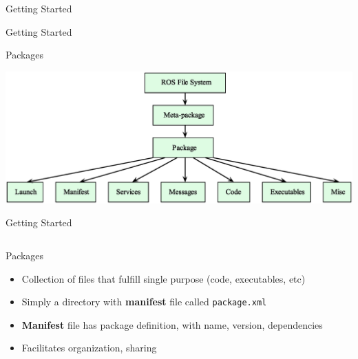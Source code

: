 \documentclass[9pt]{beamer}
\begin{document}
\begin{section}{Getting Started}
    \begin{frame}{Getting Started} \label{frame:packages}
        \begin{block}{Packages}
            \begin{center}
                \includegraphics[width=\textwidth,trim={0cm 0cm 0cm 0cm},clip]{img/ros_packages.eps}
            \end{center}        
        \end{block}
    \end{frame}
    \begin{frame}{Getting Started}
        \begin{columns}
            \begin{column}{0.5\textwidth}
                \begin{block}{Packages}
                    \begin{itemize}
                        \item Collection of files that fulfill single purpose (code, executables, etc)
                        \item Simply a directory with \textbf{manifest} file called \texttt{package.xml}
                        \item \textbf{Manifest} file has package definition, with name, version, dependencies
                        \item Facilitates organization, sharing
                    \end{itemize}
                \end{block}
            \end{column}
            \begin{column}{0.5\textwidth}
                \begin{center}

\end{center}
\end{column}
\end{columns}
\end{frame}
\end{section}
\end{document}

